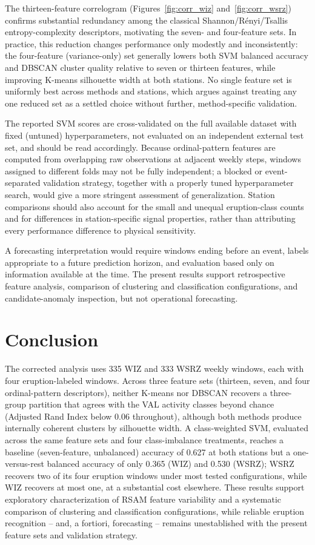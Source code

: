 \documentclass[11pt,a4paper]{article}
\begin{document}
The thirteen-feature correlogram (Figures~\ref{fig:corr_wiz} and~\ref{fig:corr_wsrz}) confirms substantial redundancy among the classical Shannon/R\'enyi/Tsallis entropy-complexity descriptors, motivating the seven- and four-feature sets. In practice, this reduction changes performance only modestly and inconsistently: the four-feature (variance-only) set generally lowers both SVM balanced accuracy and DBSCAN cluster quality relative to seven or thirteen features, while improving K-means silhouette width at both stations. No single feature set is uniformly best across methods and stations, which argues against treating any one reduced set as a settled choice without further, method-specific validation.

The reported SVM scores are cross-validated on the full available dataset with fixed (untuned) hyperparameters, not evaluated on an independent external test set, and should be read accordingly. Because ordinal-pattern features are computed from overlapping raw observations at adjacent weekly steps, windows assigned to different folds may not be fully independent; a blocked or event-separated validation strategy, together with a properly tuned hyperparameter search, would give a more stringent assessment of generalization. Station comparisons should also account for the small and unequal eruption-class counts and for differences in station-specific signal properties, rather than attributing every performance difference to physical sensitivity.

A forecasting interpretation would require windows ending before an event, labels appropriate to a future prediction horizon, and evaluation based only on information available at the time. The present results support retrospective feature analysis, comparison of clustering and classification configurations, and candidate-anomaly inspection, but not operational forecasting.

\section{Conclusion}

The corrected analysis uses 335 WIZ and 333 WSRZ weekly windows, each with four eruption-labeled windows. Across three feature sets (thirteen, seven, and four ordinal-pattern descriptors), neither K-means nor DBSCAN recovers a three-group partition that agrees with the VAL activity classes beyond chance (Adjusted Rand Index below 0.06 throughout), although both methods produce internally coherent clusters by silhouette width. A class-weighted SVM, evaluated across the same feature sets and four class-imbalance treatments, reaches a baseline (seven-feature, unbalanced) accuracy of 0.627 at both stations but a one-versus-rest balanced accuracy of only 0.365 (WIZ) and 0.530 (WSRZ); WSRZ recovers two of its four eruption windows under most tested configurations, while WIZ recovers at most one, at a substantial cost elsewhere. These results support exploratory characterization of RSAM feature variability and a systematic comparison of clustering and classification configurations, while reliable eruption recognition -- and, a fortiori, forecasting -- remains unestablished with the present feature sets and validation strategy.


	
\end{document}
